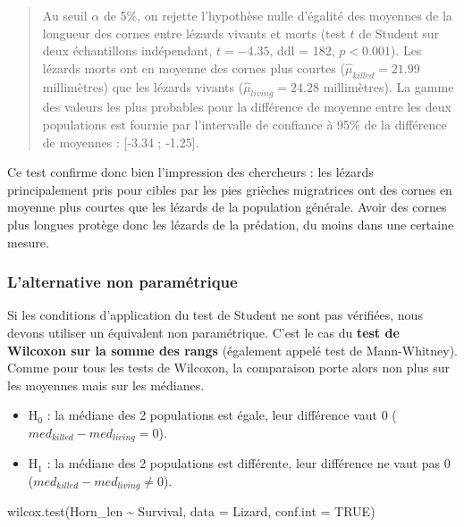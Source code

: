 \documentclass[
  a4paper,
]{article}
\newenvironment{Shaded}{\begin{snugshade}}{\end{snugshade}}
\newcommand{\AttributeTok}[1]{\textcolor[rgb]{0.00,0.34,0.68}{#1}}
\newcommand{\ConstantTok}[1]{\textcolor[rgb]{0.67,0.33,0.00}{#1}}
\newcommand{\FunctionTok}[1]{\textcolor[rgb]{0.39,0.29,0.61}{#1}}
\newcommand{\NormalTok}[1]{\textcolor[rgb]{0.12,0.11,0.11}{#1}}
\newcommand{\SpecialCharTok}[1]{\textcolor[rgb]{0.24,0.68,0.91}{#1}}
\providecommand{\tightlist}{%
  \setlength{\itemsep}{0pt}\setlength{\parskip}{0pt}}
\begin{document}
\begin{quote}
Au seuil \(\alpha\) de 5\%, on rejette l'hypothèse nulle d'égalité des moyennes de la longueur des cornes entre lézards vivants et morts (test \(t\) de Student sur deux échantillons indépendant, \(t = -4.35\), ddl = 182, \(p < 0.001\)). Les lézards morts ont en moyenne des cornes plus courtes (\(\hat{\mu}_{killed} = 21.99\) millimètres) que les lézards vivants (\(\hat{\mu}_{living} = 24.28\) millimètres). La gamme des valeurs les plus probables pour la différence de moyenne entre les deux populations est fournie par l'intervalle de confiance à 95\% de la différence de moyennes : {[}-3.34 ; -1.25{]}.
\end{quote}

Ce test confirme donc bien l'impression des chercheurs : les lézards principalement pris pour cibles par les pies grièches migratrices ont des cornes en moyenne plus courtes que les lézards de la population générale. Avoir des cornes plus longues protège donc les lézards de la prédation, du moins dans une certaine mesure.

\hypertarget{lalternative-non-paramuxe9trique-2}{%
\subsubsection{L'alternative non paramétrique}\label{lalternative-non-paramuxe9trique-2}}

Si les conditions d'application du test de Student ne sont pas vérifiées, nous devons utiliser un équivalent non paramétrique. C'est le cas du \textbf{test de Wilcoxon sur la somme des rangs} (également appelé test de Mann-Whitney). Comme pour tous les tests de Wilcoxon, la comparaison porte alors non plus sur les moyennes mais sur les médianes.

\begin{itemize}
\tightlist
\item
  H\(_0\) : la médiane des 2 populations est égale, leur différence vaut 0 (\(med_{killed}-med_{living} = 0\)).
\item
  H\(_1\) : la médiane des 2 populations est différente, leur différence ne vaut pas 0 (\(med_{killed}-med_{living}\neq 0\)).
\end{itemize}

\begin{Shaded}
\begin{Highlighting}[]
\FunctionTok{wilcox.test}\NormalTok{(Horn\_len }\SpecialCharTok{\textasciitilde{}}\NormalTok{ Survival, }\AttributeTok{data =}\NormalTok{ Lizard, }\AttributeTok{conf.int =} \ConstantTok{TRUE}\NormalTok{)}
\end{Highlighting}
\end{Shaded}
\end{document}

